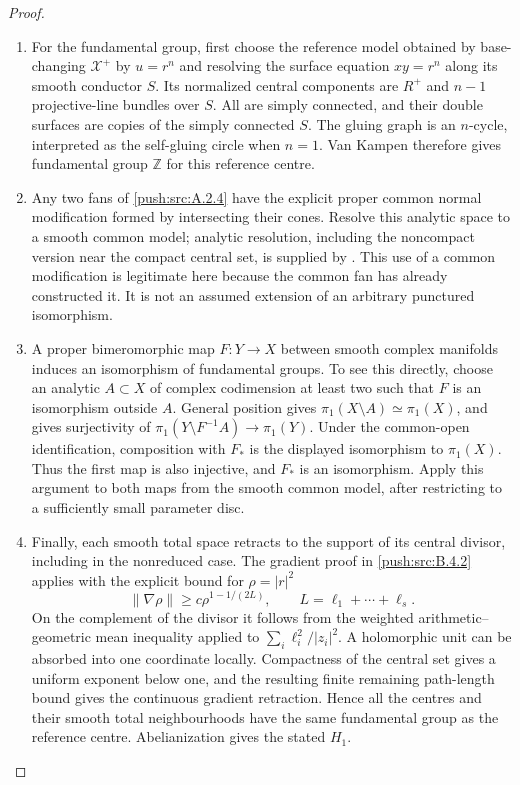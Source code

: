 \begin{proof}
\begin{enumerate}[label=\arabic*.,leftmargin=*]
\item For the fundamental group, first choose the reference
model obtained by base-changing $\mathcal X^+$ by
$u=r^n$ and resolving the surface equation $xy=r^n$
along its smooth conductor $S$. Its normalized central
components are $R^+$ and $n-1$ projective-line bundles
over $S$. All are simply connected, and their double
surfaces are copies of the simply connected $S$.
The gluing graph is an $n$-cycle, interpreted as the
self-gluing circle when $n=1$. Van Kampen therefore
gives fundamental group $\mathbb Z$ for this reference
centre.

\item Any two fans of \ref{push:src:A.2.4} have the explicit proper common
normal modification formed by intersecting their cones.
Resolve this analytic space to a smooth common model;
analytic resolution, including the noncompact version
near the compact central set, is supplied by
\cite[Theorem 1.6 and its following paragraph]{BM95AB}.
This use of a common modification is legitimate here
because the common fan has already constructed it.
It is not an assumed extension of an arbitrary punctured
isomorphism.

\item A proper bimeromorphic map $F:Y\to X$ between smooth
complex manifolds induces an isomorphism of fundamental
groups. To see this directly, choose an analytic
$A\subset X$ of complex codimension at least two such
that $F$ is an isomorphism outside $A$. General position
gives $\pi_1(X\setminus A)\simeq\pi_1(X)$, and gives
surjectivity of
$\pi_1(Y\setminus F^{-1}A)\to\pi_1(Y)$.
Under the common-open identification, composition with
$F_*$ is the displayed isomorphism to $\pi_1(X)$.
Thus the first map is also injective, and $F_*$ is an
isomorphism. Apply this argument to both maps from the
smooth common model, after restricting to a sufficiently
small parameter disc.

\item Finally, each smooth total space retracts to the support
of its central divisor, including in the nonreduced case.
The gradient proof in \ref{push:src:B.4.2} applies with the explicit
bound for $\rho=|r|^2$
\[
 \|\nabla\rho\|\geq c\rho^{1-1/(2L)},
 \qquad L=\ell_1+\cdots+\ell_s.
\]
On the complement of the divisor it follows from the
weighted arithmetic--geometric mean inequality applied
to $\sum_i\ell_i^2/|z_i|^2$. A holomorphic unit can be
absorbed into one coordinate locally. Compactness of
the central set gives a uniform exponent below one,
and the resulting finite remaining path-length bound
gives the continuous gradient retraction. Hence all
the centres and their smooth total neighbourhoods have
the same fundamental group as the reference centre.
Abelianization gives the stated $H_1$.


\end{enumerate}
\end{proof}
